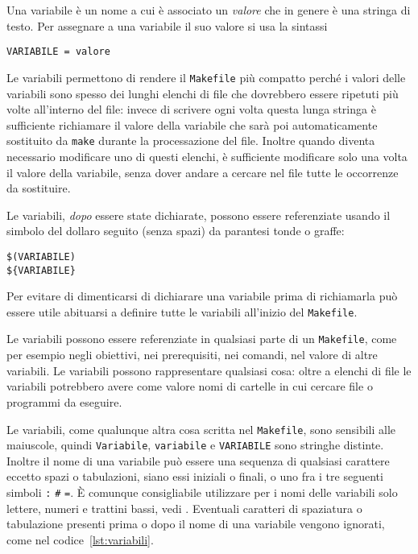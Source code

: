 Una variabile è un nome a cui è associato un \emph{valore} che in genere è una
stringa di testo.  Per assegnare a una variabile il suo valore si usa la
sintassi
\begin{lstlisting}
VARIABILE = valore
\end{lstlisting}
Le variabili permettono di rendere il \verb|Makefile| più compatto perché i
valori delle variabili sono spesso dei lunghi elenchi di file che dovrebbero
essere ripetuti più volte all'interno del file: invece di scrivere ogni volta
questa lunga stringa è sufficiente richiamare il valore della variabile che sarà
poi automaticamente sostituito da \verb|make| durante la processazione del file.
Inoltre quando diventa necessario modificare uno di questi elenchi, è
sufficiente modificare solo una volta il valore della variabile, senza dover
andare a cercare nel file tutte le occorrenze da sostituire.

Le variabili, \emph{dopo} essere state dichiarate, possono essere referenziate
usando il simbolo del dollaro seguito (senza spazi) da parantesi tonde o graffe:
\begin{lstlisting}
$(VARIABILE)
${VARIABILE}
\end{lstlisting}
Per evitare di dimenticarsi di dichiarare una variabile prima di richiamarla può
essere utile abituarsi a definire tutte le variabili all'inizio del
\verb|Makefile|.

Le variabili possono essere referenziate in qualsiasi parte di un
\verb|Makefile|, come per esempio negli obiettivi, nei prerequisiti, nei
comandi, nel valore di altre variabili.  Le variabili possono rappresentare
qualsiasi cosa: oltre a elenchi di file le variabili potrebbero avere come
valore nomi di cartelle in cui cercare file o programmi da eseguire.

Le variabili, come qualunque altra cosa scritta nel \verb|Makefile|, sono
sensibili alle maiuscole, quindi \verb|Variabile|, \verb|variabile| e
\verb|VARIABILE| sono stringhe distinte.  Inoltre il nome di una variabile può
essere una sequenza di qualsiasi carattere eccetto spazi o tabulazioni, siano
essi iniziali o finali, o uno fra i tre seguenti simboli \verb|:| \verb|#|
\verb|=|.  È comunque consigliabile utilizzare per i nomi delle variabili solo
lettere, numeri e trattini bassi, vedi \textcite[57]{gnu:make}.  Eventuali
caratteri di spaziatura o tabulazione presenti prima o dopo il nome di una
variabile vengono ignorati, come nel codice~\ref{lst:variabili}.

